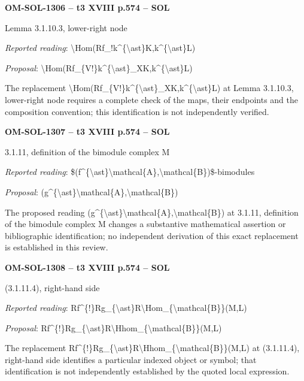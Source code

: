 \par\noindent\textbf{OM-SOL-1306 -- t3 XVIII p.574 -- SOL}\par
Lemma 3.1.10.3, lower-right node\par
\emph{Reported reading}: \textbackslash{}Hom(Rf\_!k\textasciicircum{}\{\textbackslash{}ast\}K,k\textasciicircum{}\{\textbackslash{}ast\}L)\par
\emph{Proposal}: \textbackslash{}Hom(Rf\_\{V!\}k\textasciicircum{}\{\textbackslash{}ast\}\_XK,k\textasciicircum{}\{\textbackslash{}ast\}L)\par
The replacement \textbackslash{}Hom(Rf\_\{V!\}k\textasciicircum{}\{\textbackslash{}ast\}\_XK,k\textasciicircum{}\{\textbackslash{}ast\}L) at Lemma 3.1.10.3, lower-right node requires a complete check of the maps, their endpoints and the composition convention; this identification is not independently verified.\par
\par\noindent\textbf{OM-SOL-1307 -- t3 XVIII p.574 -- SOL}\par
3.1.11, definition of the bimodule complex M\par
\emph{Reported reading}: \$(f\textasciicircum{}\{\textbackslash{}ast\}\textbackslash{}mathcal\{A\},\textbackslash{}mathcal\{B\})\$-bimodules\par
\emph{Proposal}: (g\textasciicircum{}\{\textbackslash{}ast\}\textbackslash{}mathcal\{A\},\textbackslash{}mathcal\{B\})\par
The proposed reading (g\textasciicircum{}\{\textbackslash{}ast\}\textbackslash{}mathcal\{A\},\textbackslash{}mathcal\{B\}) at 3.1.11, definition of the bimodule complex M changes a substantive mathematical assertion or bibliographic identification; no independent derivation of this exact replacement is established in this review.\par
\par\noindent\textbf{OM-SOL-1308 -- t3 XVIII p.574 -- SOL}\par
(3.1.11.4), right-hand side\par
\emph{Reported reading}: Rf\textasciicircum{}\{!\}Rg\_\{\textbackslash{}ast\}R\textbackslash{}Hom\_\{\textbackslash{}mathcal\{B\}\}(M,L)\par
\emph{Proposal}: Rf\textasciicircum{}\{!\}Rg\_\{\textbackslash{}ast\}R\textbackslash{}Hhom\_\{\textbackslash{}mathcal\{B\}\}(M,L)\par
The replacement Rf\textasciicircum{}\{!\}Rg\_\{\textbackslash{}ast\}R\textbackslash{}Hhom\_\{\textbackslash{}mathcal\{B\}\}(M,L) at (3.1.11.4), right-hand side identifies a particular indexed object or symbol; that identification is not independently established by the quoted local expression.\par
